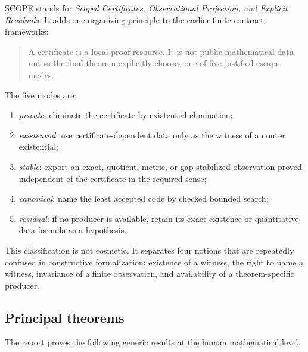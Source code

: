 SCOPE stands for \emph{Scoped Certificates, Observational Projection, and Explicit Residuals}.  It adds one organizing principle to the earlier finite-contract frameworks:

\begin{quote}
A certificate is a local proof resource.  It is not public mathematical data unless the final theorem explicitly chooses one of five justified escape modes.
\end{quote}

The five modes are:

\begin{enumerate}
\item \emph{private}: eliminate the certificate by existential elimination;
\item \emph{existential}: use certificate-dependent data only as the witness of an outer existential;
\item \emph{stable}: export an exact, quotient, metric, or gap-stabilized observation proved independent of the certificate in the required sense;
\item \emph{canonical}: name the least accepted code by checked bounded search;
\item \emph{residual}: if no producer is available, retain its exact existence or quantitative data formula as a hypothesis.
\end{enumerate}

This classification is not cosmetic.  It separates four notions that are repeatedly confused in constructive formalization: existence of a witness, the right to name a witness, invariance of a finite observation, and availability of a theorem-specific producer.

\subsection{Principal theorems}

The report proves the following generic results at the human mathematical level.


